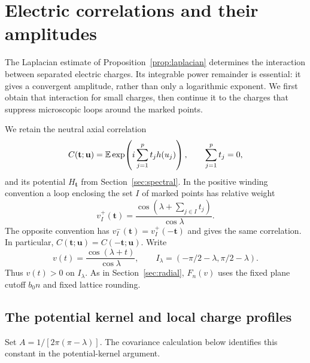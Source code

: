 \section{Electric correlations and their amplitudes}\label{sec:electric}

The Laplacian estimate of Proposition~\ref{prop:laplacian} determines
the interaction between separated electric charges.  Its integrable
power remainder is essential: it gives a convergent amplitude, rather
than only a logarithmic exponent.  We first obtain that interaction for
small charges, then continue it to the charges that suppress microscopic
loops around the marked points.

We retain the neutral axial correlation
\[
 C(\mathbf t;\mathbf u)
 =\mathbb E\exp\!\left(i\sum_{j=1}^p t_jh(u_j)\right),
 \qquad \sum_{j=1}^p t_j=0,
\]
and its potential $H_{\mathbf t}$ from Section~\ref{sec:spectral}.
In the positive winding convention a loop enclosing the set $I$ of
marked points has relative weight
\[
 v_I^+(\mathbf t)=
 \frac{\cos(\lambda+\sum_{j\in I}t_j)}{\cos\lambda}.
\]
The opposite convention has $v_I^-(\mathbf t)=v_I^+(-\mathbf t)$
and gives the same correlation.  In particular,
$C(\mathbf t;\mathbf u)=C(-\mathbf t;\mathbf u)$.
Write
\[
 v(t)=\frac{\cos(\lambda+t)}{\cos\lambda},\qquad
 I_\lambda=(-\pi/2-\lambda,\pi/2-\lambda).
\]
Thus $v(t)>0$ on $I_\lambda$.  As in Section~\ref{sec:radial},
$F_n(v)$ uses the fixed plane cutoff $b_0n$ and fixed lattice rounding.

\subsection{The potential kernel and local charge profiles}

Set $A=1/[2\pi(\pi-\lambda)]$.  The covariance calculation below
identifies this constant in the potential-kernel argument.

